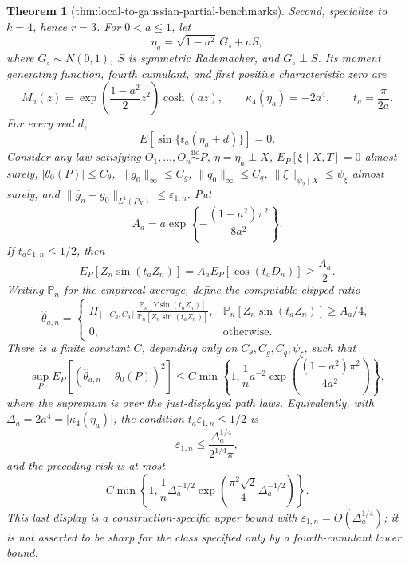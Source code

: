 \documentclass{article}
\newtheorem{theorem}{Theorem}
\begin{document}
\begin{theorem}[thm:local-to-gaussian-partial-benchmarks]
Second, specialize to \(k=4\), hence \(r=3\).  For \(0<a\le1\), let
\[
 \eta_a=\sqrt{1-a^2}\,G_{\circ}+aS,
\]
where \(G_{\circ}\sim N(0,1)\), \(S\) is symmetric Rademacher, and \(G_{\circ}\perp S\).  Its moment generating function, fourth cumulant, and first positive characteristic zero are
\[
 M_a(z)=\exp\!\left(\frac{1-a^2}{2}z^2\right)\cosh(az),
 \qquad
 \kappa_4(\eta_a)=-2a^4,
 \qquad
 t_a=\frac{\pi}{2a}.
\]
For every real \(d\),
\[
 E\!\left[\sin\{t_a(\eta_a+d)\}\right]=0.
\]
Consider any law satisfying \(O_1,\ldots,O_n\stackrel{\mathrm{iid}}{\sim}P\), \(\eta=\eta_a\perp X\), \(E_P[\xi\mid X,T]=0\) almost surely, \(\lvert\theta_0(P)\rvert\le C_{\theta}\), \(\lVert g_0\rVert_{\infty}\le C_g\), \(\lVert q_0\rVert_{\infty}\le C_q\), \(\lVert\xi\rVert_{\psi_2\mid X}\le\psi_{\xi}\) almost surely, and \(\lVert\bar g_n-g_0\rVert_{L^1(P_X)}\le\varepsilon_{1,n}\).  Put
\[
 A_a=a\exp\!\left\{-\frac{(1-a^2)\pi^2}{8a^2}\right\}.
\]
If \(t_a\varepsilon_{1,n}\le1/2\), then
\[
 E_P\!\left[Z_n\sin(t_aZ_n)\right]
 =A_aE_P[\cos(t_aD_n)]
 \ge\frac{A_a}{2}.
\]
Writing \(\mathbb P_n\) for the empirical average, define the computable clipped ratio
\[
 \widehat\theta_{a,n}
 =
 \begin{cases}
 \displaystyle
 \Pi_{[-C_{\theta},C_{\theta}]}
 \frac{\mathbb P_n[Y\sin(t_aZ_n)]}
      {\mathbb P_n[Z_n\sin(t_aZ_n)]},
 &\displaystyle
 \mathbb P_n[Z_n\sin(t_aZ_n)]\ge A_a/4,\\[3mm]
 0,&\text{otherwise}.
 \end{cases}
\]
There is a finite constant \(C\), depending only on \(C_{\theta},C_g,C_q,\psi_{\xi}\), such that
\[
 \sup_P E_P\!\left[(\widehat\theta_{a,n}-\theta_0(P))^2\right]
 \le
 C\min\!\left\{
  1,\frac{1}{n}a^{-2}
  \exp\!\left(\frac{(1-a^2)\pi^2}{4a^2}\right)
 \right\},
\]
where the supremum is over the just-displayed path laws.  Equivalently, with \(\Delta_a=2a^4=\lvert\kappa_4(\eta_a)\rvert\), the condition \(t_a\varepsilon_{1,n}\le1/2\) is
\[
 \varepsilon_{1,n}\le\frac{\Delta_a^{1/4}}{2^{1/4}\pi},
\]
and the preceding risk is at most
\[
 C\min\!\left\{
  1,\frac{1}{n}\Delta_a^{-1/2}
  \exp\!\left(\frac{\pi^2\sqrt2}{4}\Delta_a^{-1/2}\right)
 \right\}.
\]
This last display is a construction-specific upper bound with \(\varepsilon_{1,n}=O(\Delta_a^{1/4})\); it is not asserted to be sharp for the class specified only by a fourth-cumulant lower bound.
\end{theorem}
\end{document}
